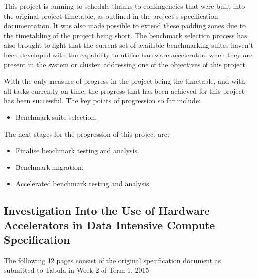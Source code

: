 \documentclass[12pt,a4paper]{article}
\begin{document}
        This project is running to schedule thanks to contingencies that were built into the original project timetable, as outlined in the project's specification documentation. It was also made possible to extend these padding zones due to the timetabling of the project being short. The benchmark selection process has also brought to light that the current set of available benchmarking suites haven't been developed with the capability to utilise hardware accelerators when they are present in the system or cluster, addressing one of the objectives of this project. 

        With the only measure of progress in the project being the timetable, and with all tasks currently on time, the progress that has been achieved for this project has been successful. The key points of progression so far include:

        \begin{itemize}
            \item Benchmark suite selection.
        \end{itemize}

        The next stages for the progression of this project are:

        \begin{itemize}
            \item Finalise benchmark testing and analysis.
            \item Benchmark migration.
            \item Accelerated benchmark testing and analysis.
        \end{itemize}

	\printbibliography
	
    \clearpage
	\begin{appendices}
	    \section{Investigation Into the Use of Hardware Accelerators in Data Intensive Compute Specification}
	    The following 12 pages consist of the original specification document as submitted to Tabula in Week 2 of Term 1, 2015
	    \label{app:specification}
	    
	        
	\end{appendices}
\end{document}
